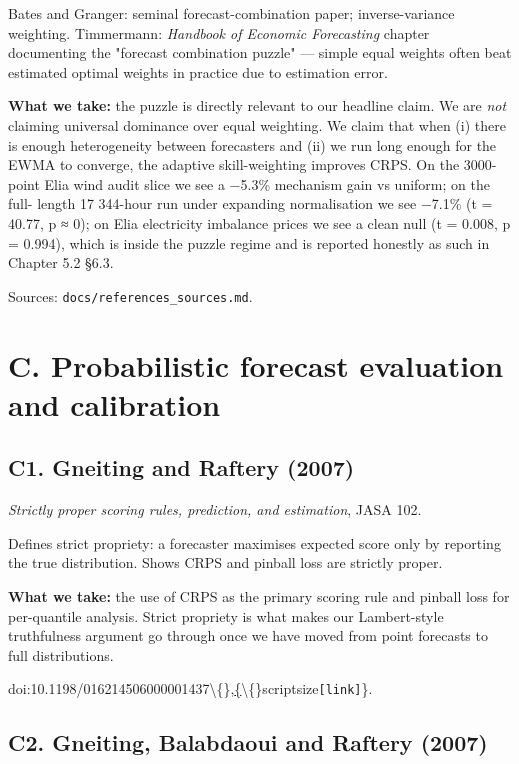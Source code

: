 \documentclass[11pt,a4paper,openany]{report}
\begin{document}
Bates and Granger: seminal forecast-combination paper; inverse-variance
weighting. Timmermann: \emph{Handbook of Economic Forecasting} chapter
documenting the "forecast combination puzzle" — simple equal weights
often beat estimated optimal weights in practice due to estimation error.

\textbf{What we take:} the puzzle is directly relevant to our headline
claim. We are \emph{not} claiming universal dominance over equal weighting.
We claim that when (i) there is enough heterogeneity between
forecasters and (ii) we run long enough for the EWMA to converge, the
adaptive skill-weighting improves CRPS. On the 3000-point Elia wind
audit slice we see a −5.3\% mechanism gain vs uniform; on the full-
length 17 344-hour run under expanding normalisation we see −7.1\%
(t = 40.77, p ≈ 0); on Elia electricity imbalance prices we see a
clean null (t = 0.008, p = 0.994), which is inside the puzzle regime
and is reported honestly as such in Chapter 5.2 §6.3.

Sources: \texttt{docs/references\_sources.md}.

\section{C. Probabilistic forecast evaluation and calibration}

\subsection{C1. Gneiting and Raftery (2007)}

\emph{Strictly proper scoring rules, prediction, and estimation}, JASA 102.

Defines strict propriety: a forecaster maximises expected score only by
reporting the true distribution. Shows CRPS and pinball loss are
strictly proper.

\textbf{What we take:} the use of CRPS as the primary scoring rule and pinball
loss for per-quantile analysis. Strict propriety is what makes our
Lambert-style truthfulness argument go through once we have moved from
point forecasts to full distributions.

doi:10.1198/016214506000001437\textbackslash\{\},\href{https://doi.org/10.1198/016214506000001437}\{\textbackslash\{\}scriptsize\texttt{[link]}\}.

\subsection{C2. Gneiting, Balabdaoui and Raftery (2007)}
\end{document}
